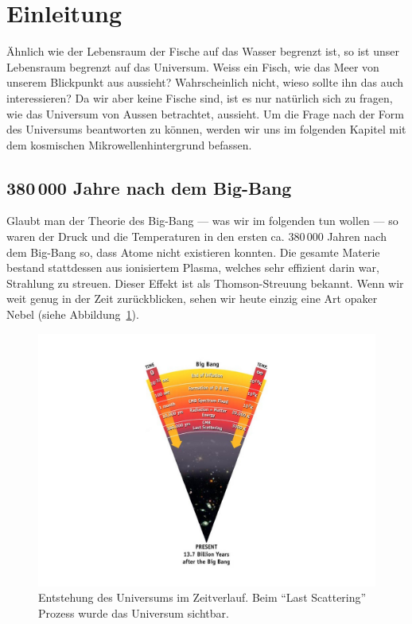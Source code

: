 \section{Einleitung}
Ähnlich wie der Lebensraum der Fische auf das Wasser begrenzt ist, so ist unser 
Lebensraum begrenzt auf das Universum.
Weiss ein Fisch, wie das Meer von unserem Blickpunkt aus aussieht?
Wahrscheinlich nicht, wieso sollte ihn das auch interessieren?
Da wir aber keine Fische sind, ist es nur natürlich sich zu fragen, wie das 
Universum von Aussen betrachtet, aussieht.
Um die Frage nach der Form des Universums beantworten zu können, werden wir uns 
im folgenden Kapitel mit dem kosmischen Mikrowellenhintergrund befassen.

\subsection{380\,000 Jahre nach dem Big-Bang}
Glaubt man der Theorie des Big-Bang --- was wir im folgenden tun wollen --- so 
%
waren 
der Druck und die Temperaturen in den ersten ca. 380\,000 Jahren nach dem 
Big-Bang so, dass Atome nicht existieren konnten.
Die gesamte Materie bestand stattdessen aus ionisiertem Plasma, welches sehr 
%
effizient darin war, Strahlung zu streuen. Dieser Effekt ist als 
Thomson-Streuung bekannt.
Wenn wir weit genug in der Zeit zurückblicken, sehen wir heute einzig eine Art 
opaker Nebel (siehe Abbildung~\ref{fig:radiation_scattering}).
\begin{figure}
	\centering
	\includegraphics[width=\linewidth]{cmb/images/radiation_scattering.jpg}
	\caption{Entstehung des Universums im Zeitverlauf. Beim ``Last Scattering'' 
	Prozess wurde das Universum sichtbar.}
	\label{fig:radiation_scattering}
\end{figure}


